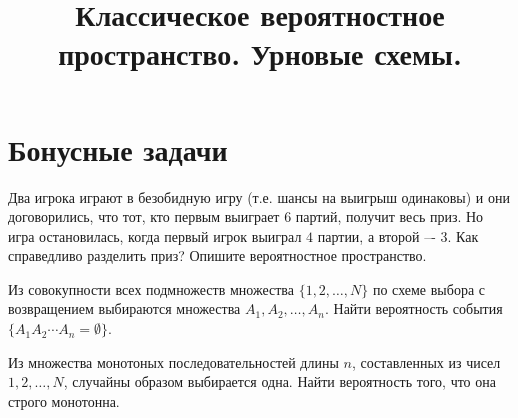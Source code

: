 

\title{Классическое вероятностное пространство. Урновые схемы.} 
\date{\vspace{-1cm}}


\maketitle

\section*{Бонусные задачи}
\begin{problem}
    Два игрока играют в безобидную игру (т.е. шансы на выигрыш одинаковы) и они договорились, что тот, кто первым выиграет $6$ партий, получит весь приз.
    Но игра остановилась, когда первый игрок выиграл $4$ партии, а второй –- $3$.
    Как справедливо разделить приз?
    Опишите вероятностное пространство.
\end{problem}

\begin{problem}
    Из совокупности всех подмножеств множества $\{1, 2, \ldots, N \}$ по схеме выбора с возвращением выбираются множества $A_1, A_2, \ldots, A_n$.
    Найти вероятность события $\{A_1 A_2 \cdots A_n = \emptyset\}$.
\end{problem}

\begin{problem}
    Из множества монотоных последовательностей длины $n$, составленных из чисел $1, 2, \ldots, N$, случайны образом выбирается одна.
    Найти вероятность того, что она строго монотонна.
\end{problem}

